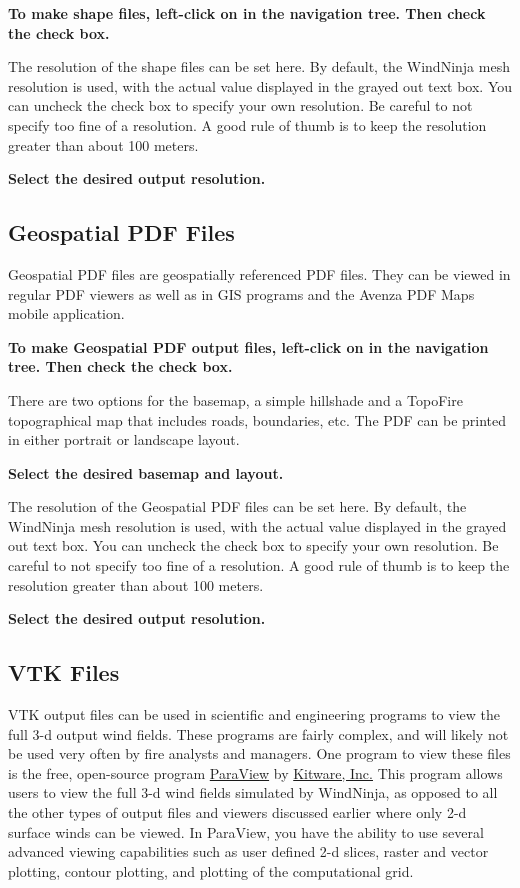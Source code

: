 \documentclass[12pt]{article}
\begin{document}
\textbf{\color{red} To make shape files, left-click on  in the navigation tree.  Then check the  check box.}

The resolution of the shape files can be set here.  By default, the WindNinja mesh resolution is used, with the actual value displayed in the grayed out text box.  You can uncheck the  check box to specify your own resolution.  Be careful to not specify too fine of a resolution.  A good rule of thumb is to keep the resolution greater than about 100 meters.

\textbf{\color{red} Select the desired output resolution.}

\subsection{Geospatial PDF Files}

Geospatial PDF files are geospatially referenced PDF files. They can be viewed in regular PDF viewers as well as in GIS programs and the Avenza PDF Maps mobile application. 

\textbf{\color{red} To make Geospatial PDF output files, left-click on  in the navigation tree.  Then check the  check box.}

There are two options for the basemap, a simple hillshade and a TopoFire topographical map that includes roads, boundaries, etc. The PDF can be printed in either portrait or landscape layout.

\textbf{\color{red} Select the desired basemap and layout.}

The resolution of the Geospatial PDF files can be set here.  By default, the WindNinja mesh resolution is used, with the actual value displayed in the grayed out text box.  You can uncheck the  check box to specify your own resolution.  Be careful to not specify too fine of a resolution.  A good rule of thumb is to keep the resolution greater than about 100 meters.

\textbf{\color{red} Select the desired output resolution.}

\subsection{VTK Files}

VTK output files can be used in scientific and engineering programs to view the full 3-d output wind fields.  These programs are fairly complex, and will likely not be used very often by fire analysts and managers.  One program to view these files is the free, open-source program \href{http://www.paraview.org/}{ParaView} by \href{http://www.kitware.com/}{Kitware, Inc.}  This program allows users to view the full 3-d wind fields simulated by WindNinja, as opposed to all the other types of output files and viewers discussed earlier where only 2-d surface winds can be viewed.  In ParaView, you have the ability to use several advanced viewing capabilities such as user defined 2-d slices, raster and vector plotting, contour plotting, and plotting of the computational grid.
\end{document}
